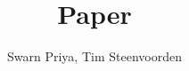 \documentclass[sigconf,\ifvlversion,authorversion\fi]{acmart}
\theoremstyle{definition}
\begin{document}
\ifvlversion
\fancyfoot[C]{\thepage}
\else
	\fancyhead{} 
\fi


\title{Paper}
\author{Swarn Priya, Tim Steenvoorden}
\maketitle
\pagestyle{plain}








%
%
\end{document}
